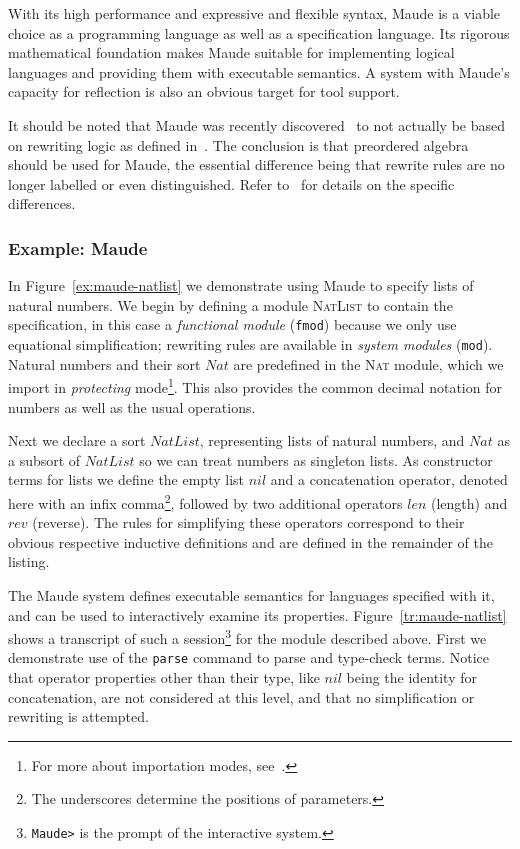 \documentclass[11pt]{article}
\begin{document}
With its high performance and expressive and flexible syntax, Maude is a viable choice as a programming language as well as a specification language. Its rigorous mathematical foundation makes Maude suitable for implementing logical languages and providing them with executable semantics. A system with Maude's capacity for reflection is also an obvious target for tool support.

It should be noted that Maude was recently discovered~\cite{Codescu:2010} to not actually be based on rewriting logic as defined in~\cite{Meseguer:1992}. The conclusion is that preordered algebra~\cite{CafeObjRep} should be used for Maude, the essential difference being that rewrite rules are no longer labelled or even distinguished. Refer to~\cite{Codescu:2010} for details on the specific differences.


\subsubsection{Example: Maude}
\label{sub:introduction_maude_example}

In Figure~\ref{ex:maude-natlist} we demonstrate using Maude to specify lists of natural numbers. We begin by defining a module \textsc{NatList} to contain the specification, in this case a \emph{functional module} (\texttt{fmod}) because we only use equational simplification; rewriting rules are available in \emph{system modules} (\texttt{mod}). Natural numbers and their sort $Nat$ are predefined in the \textsc{Nat} module, which we import in \emph{protecting} mode\footnote{For more about importation modes, see~\cite[ch. 8.1]{Clavel:2007}.}. This also provides the common decimal notation for numbers as well as the usual operations.

Next we declare a sort $NatList$, representing lists of natural numbers, and $Nat$ as a subsort of $NatList$ so we can treat numbers as singleton lists. As constructor terms for lists we define the empty list $nil$ and a concatenation operator, denoted here with an infix comma\footnote{The underscores determine the positions of parameters.}, followed by two additional operators $len$ (length) and $rev$ (reverse). The rules for simplifying these operators correspond to their obvious respective inductive definitions and are defined in the remainder of the listing.

The Maude system defines executable semantics for languages specified with it, and can be used to interactively examine its properties. Figure~\ref{tr:maude-natlist} shows a transcript of such a session\footnote{\texttt{Maude>} is the prompt of the interactive system.} for the module described above. First we demonstrate use of the \texttt{parse} command to parse and type-check terms. Notice that operator properties other than their type, like $nil$ being the identity for concatenation, are not considered at this level, and that no simplification or rewriting is attempted.
\end{document}
